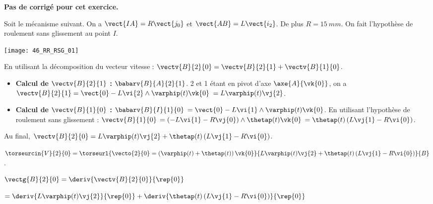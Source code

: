 \normalfalse \difficiletrue \tdifficilefalse
\correctiontrue


\setcounter{numques}{0}
\ifcorrection
\else
\textbf{Pas de corrigé pour cet exercice.}
\fi

\ifprof
\else
Soit le mécanisme suivant. On a $\vect{IA}=R\vect{j_0}$ et $\vect{AB}=L\vect{i_2}$. De plus $R=\SI{15}{mm}$. On fait l'hypothèse de roulement sans glissement au point $I$.
\begin{center}
\texttt{[image: 46\_RR\_RSG\_01]}
\end{center}
\fi


\ifprof
En utilisant la décomposition du vecteur vitesse : 
$\vectv{B}{2}{0} = \vectv{B}{2}{1} +  \vectv{B}{1}{0}$.

\begin{itemize}
\item \textbf{Calcul de $ \vectv{B}{2}{1}$ :}  $\babarv{B}{A}{2}{1}$. 2 et 1 étant en pivot d'axe $\axe{A}{\vk{0}}$, on a $\vectv{B}{2}{1}=\vect{0}-L\vi{2}\wedge \varphip(t)\vk{0}$
$=L\varphip(t)\vj{2}$.
\item \textbf{Calcul de $ \vectv{B}{1}{0}$ :}  $\babarv{B}{I}{1}{0}$ $=\vect{0}-L\vi{1}\wedge \varphip(t)\vk{0}$. En utilisant l'hypothèse de roulement sans glissement : $ \vectv{B}{1}{0}$  $=\left(-L\vi{1}-R\vj{0}\right)\wedge \thetap(t)\vk{0}$  $=\thetap(t)\left(L\vj{1}-R\vi{0}\right)$.
\end{itemize}

Au final, $\vectv{B}{2}{0} = L\varphip(t)\vj{2} +\thetap(t)\left(L\vj{1}-R\vi{0}\right) $.


\else
\fi

\ifprof
 $\torseurcin{V}{2}{0} = \torseurl{\vecto{2}{0}=\left( \varphip(t)+\thetap(t) \right) \vk{0} }{ L\varphip(t)\vj{2} +\thetap(t)\left(L\vj{1}-R\vi{0}\right)}{B}$.
 

\else
\fi


\ifprof
$\vectg{B}{2}{0} = \deriv{\vectv{B}{2}{0}}{\rep{0}}$

$ = \deriv{L\varphip(t)\vj{2}}{\rep{0}} + \deriv{\thetap(t)\left(L\vj{1}-R\vi{0}\right)}{\rep{0}}$

